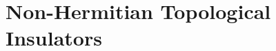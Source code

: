 \documentclass[aps,prb,epsf,epsfig,floatfix,showpacs,groupedaddres,superscriptaddress]{revtex4-1}
\numberwithin{equation}{section}
\def\blgn#1\elgn{\begin{align}#1\end{align}}
\newcommand{\f}{\frac}
\def\sig{\sigma}
\newcommand{\grad}{\nabla}
\def\tbs{[\textcolor{red}{*to be shown}]}
\begin{document}


\begin{comment}
\subsection*{Berry phase:}
The function $1+\cos ka\ge 0$ $\forall\,k$. Hence
when $\delt>0$, we always have $d_x(k)=t(1+\cos ka) +\delt\,(1-\cos ka)>0$.
Thus $d_x(k)$ sweeps no solid angle at $\delt>0$. On the other hand, 
when $\delt<0$,  $d_x(k)=2\delt$ at $k=\pm \pi/a$; this  $d_x(k)$ sweeps an angle
$2\pi$ {\red[more clear explanation needed, e.g. how it sweeps a solid angle]}.


\section{Polarization in 1D}
Electric polarization $\Pv$ is defined as the dipole moment per unit volume. 
Polarization leads to the bound charge $\rho_b=-\grad.\Pv$ in the bulk and 
surface/edge/end charge $\sig_b=\Pv.\ncap$ in 3D/2D/in. In the 1D we rename
the end charge as $\Qe$ and it simply becomes the magnitude of polarization
\blgn
\Qe=P\,.
\elgn
 
The polarization in 1D can be identified with the Berry phase 
of the occupied Bloch wavefunctions around the Brillouin zone:
\blgn
P=\f{e}{2\pi}\oint_\BZ A(k)dk\,.
\elgn
[{\bf N.B.} Detailed derivation is not straigh-forward, should be found in the literature.]\tbs


\section{Thouless charge pump}
  The integer charge pumped across a 1D insulator in one period of an adiabatic cycle
is a topological invariant that characterizes the cycle. (Courtesy: Kane's slide)

\blgn
H(k,t+T)=H(k,t)\,
\elgn
leads to
\blgn
\Del P=\f{e}{2\pi}\oint dk\, (A(k,T)-A(k,0)=ne\,,
\elgn
where
\blgn
n=%
\elgn
\end{comment}


\section{Non-Hermitian Topological Insulators} 
\end{document}
